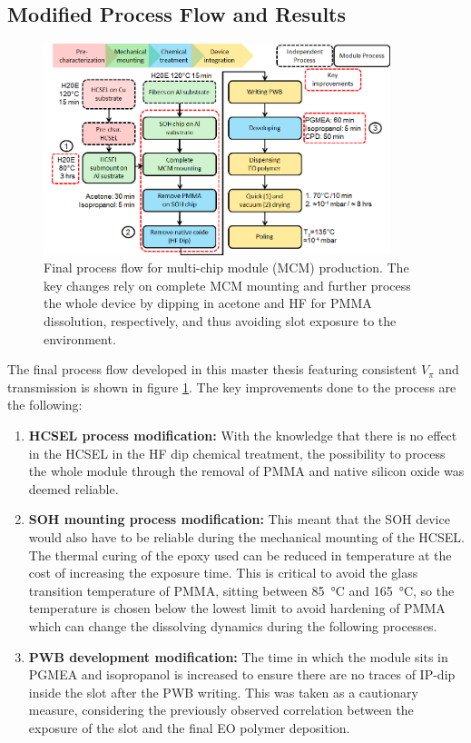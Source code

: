 \subsection{Modified Process Flow and Results}

\begin{figure}[!ht]
\centering
  \includegraphics[width=0.9\textwidth]{visio/final_process}
  \caption{Final process flow for multi-chip module (MCM) production. The key changes rely on complete MCM mounting and further process the whole device by dipping in acetone and HF for PMMA  dissolution, respectively, and thus avoiding slot exposure to the environment.}
  \label{fig:fproc}
\end{figure}

The final process flow developed in this master thesis featuring consistent $V_\pi$ and transmission is shown in figure \ref{fig:fproc}. The key improvements done to the process are the following:

\begin{enumerate}
\item \textbf{HCSEL process modification:} With the knowledge that there is no effect in the HCSEL in the HF dip chemical treatment, the possibility to process the whole module through the removal of PMMA and native silicon oxide was deemed reliable. 
\item \textbf{SOH mounting process modification:} This meant that the SOH device would also have to be reliable during the mechanical mounting of the HCSEL. The thermal curing of the epoxy used can be reduced in temperature at the cost of increasing the exposure time. This is critical to avoid the glass transition temperature of PMMA, sitting between \SI{85}{\celsius} and \SI{165}{\celsius}, so the temperature is chosen below the lowest limit to avoid hardening of PMMA which can change the dissolving dynamics during the following processes.
\item \textbf{PWB development modification:} The time in which the module sits in PGMEA and isopropanol is increased to ensure there are no traces of IP-dip inside the slot after the PWB writing. This was taken as a cautionary measure, considering the previously observed correlation between the exposure of the slot and the final EO polymer deposition.
\end{enumerate}

